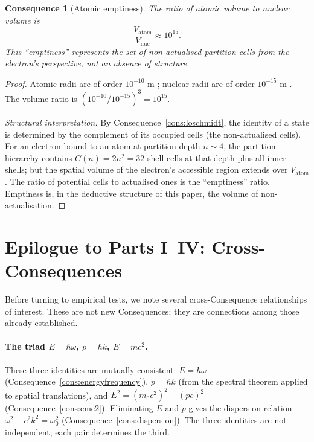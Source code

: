 \documentclass[11pt,twocolumn,a4paper]{article}
\theoremstyle{axiomstyle}
\theoremstyle{conseqstyle}
\newtheorem{consequence}{Consequence}
\theoremstyle{definition}
\theoremstyle{remark}
\begin{document}
\begin{consequence}[Atomic emptiness]
\label{cons:atomicemptiness}
The ratio of atomic volume to nuclear volume is
\begin{equation}
\frac{V_{\text{atom}}}{V_{\text{nuc}}}\approx 10^{15}.
\label{eq:emptiness}
\end{equation}
This ``emptiness'' represents the set of non-actualised partition cells from the electron's perspective, not an absence of structure.
\end{consequence}

\begin{proof}
Atomic radii are of order $10^{-10}$ m \citep{nistasd}; nuclear radii are of order $10^{-15}$ m \citep{hofstadter1956}. The volume ratio is $(10^{-10}/10^{-15})^{3}=10^{15}$.

\emph{Structural interpretation.} By Consequence~\ref{cons:loschmidt}, the identity of a state is determined by the complement of its occupied cells (the non-actualised cells). For an electron bound to an atom at partition depth $n\sim 4$, the partition hierarchy contains $C(n)=2n^{2}=32$ shell cells at that depth plus all inner shells; but the spatial volume of the electron's accessible region extends over $V_{\text{atom}}$. The ratio of potential cells to actualised ones is the ``emptiness'' ratio. Emptiness is, in the deductive structure of this paper, the volume of non-actualisation.
\end{proof}

\section*{Epilogue to Parts I--IV: Cross-Consequences}

Before turning to empirical tests, we note several cross-Consequence relationships of interest. These are not new Consequences; they are connections among those already established.

\paragraph{The triad $E=\hbar\omega$, $p=\hbar k$, $E=mc^{2}$.} These three identities are mutually consistent: $E=\hbar\omega$ (Consequence~\ref{cons:energyfrequency}), $p=\hbar k$ (from the spectral theorem applied to spatial translations), and $E^{2}=(m_{0}c^{2})^{2}+(pc)^{2}$ (Consequence~\ref{cons:emc2}). Eliminating $E$ and $p$ gives the dispersion relation $\omega^{2}-c^{2}k^{2}=\omega_{0}^{2}$ (Consequence~\ref{cons:dispersion}). The three identities are not independent; each pair determines the third.
\end{document}

